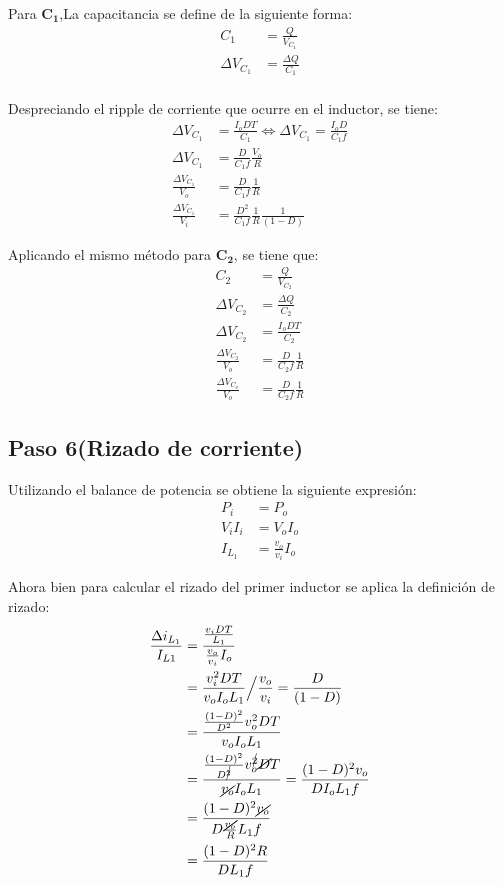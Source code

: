 Para $\mathbf{C_1}$,La capacitancia se define de la siguiente forma:
\begin{align*}
    C_1&=\frac{Q}{V_{C_1}} \\ 
    \Delta V_{C_1} &= \frac{\Delta Q}{C_1} \\ 
\end{align*}

Despreciando el ripple de corriente que ocurre en el inductor, se tiene:
\begin{align*}
    \Delta V_{C_1}&= \frac{I_oDT}{C_1} \iff \Delta V_{C_1}= \frac{I_oD}{C_1 f} \\ 
    \Delta V_{C_1}&= \frac{D}{C_1 f}\frac{V_o}{R} \\ 
    \frac{\Delta V_{C_1}}{V_o}&= \frac{D}{C_1 f}\frac{1}{R} \\ 
    \frac{\Delta V_{C_1}}{V_i}&= \frac{D^2}{C_1 f}\frac{1}{R}\frac{1}{(1-D)}
\end{align*}

Aplicando el mismo método para $\mathbf{C_2}$, se tiene que: 
\begin{align*}
    C_2&=\frac{Q}{V_{C_2}} \\ 
    \Delta V_{C_2}&= \frac{\Delta Q}{C_2} \\ 
    \Delta V_{C_2}&= \frac{I_oDT}{C_2} \\ 
    \frac{\Delta V_{C_2}}{V_o}&= \frac{D}{C_2f}\frac{1}{R} \\ 
    \frac{\Delta V_{C_o}}{V_o}&= \frac{D}{C_2f}\frac{1}{R}
\end{align*}

\subsection{Paso 6(Rizado de corriente)}

Utilizando el balance de potencia se obtiene la siguiente expresión:
\begin{align*}
    P_i&=P_o \\ 
    V_iI_i&=V_oI_o \\ 
    I_{L_1}&=\frac{v_o}{v_i}I_o 
\end{align*}

Ahora bien para calcular el rizado del primer inductor se aplica la definición de rizado:
\begin{align*}
    \frac{\Delta i_{L_1}}{I_{L1}}&=\frac{\frac{v_iDT}{L_1}}{\frac{v_o}{v_i}I_o} \\ 
    &=\frac{v_i^2DT}{v_o I_o L_1} \Big/ \frac{v_o}{v_i}=\frac{D}{(1-D)} \\ 
    &=\frac{\frac{(1-D)^2}{D^2}v_o^2 DT}{v_o I_o L_1} \\ 
    &=\frac{\frac{(1-D)^{2}}{D^{\cancel{2}}}v_o^{\cancel{2}} \cancel{D}T}{\cancel{v_o} I_o L_1}=\frac{(1-D)^2v_o}{D I_o L_1 f} \\ 
    &=\frac{(1-D)^2\cancel{v_o}}{D \frac{\cancel{v_o}}{R} L_1 f} \\ 
    &=\frac{(1-D)^2 R}{D  L_1 f} \\ 
\end{align*}


